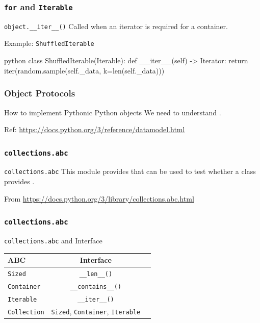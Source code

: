 \documentclass[aspectratio=169,dvipdfmx,12pt,notheorems]{beamer}
\theoremstyle{definition}
\begin{document}
\begin{frame}[fragile]\frametitle{\texttt{for} and \texttt{Iterable}}

\begin{block}{\texttt{object.\_\_iter\_\_()}}
Called when an iterator is required for a container. 
\end{block}

\begin{exampleblock}{Example: \texttt{ShuffledIterable}}
\begin{pygments}{python}
class ShuffledIterable(Iterable):
    def __iter__(self) -> Iterator:
        return iter(random.sample(self._data, k=len(self._data)))
\end{pygments}
\end{exampleblock}

\end{frame}

\begin{frame}\frametitle{Object Protocols}

\begin{block}{How to implement Pythonic Python objects}
We need to understand .
\end{block}
Ref: \url{https://docs.python.org/3/reference/datamodel.html}

\end{frame}

\begin{frame}\frametitle{\texttt{collections.abc}}

\begin{block}{\texttt{collections.abc}}
This module provides  that can be used to test whether a class provides .
\end{block}
From \url{https://docs.python.org/3/library/collections.abc.html}

\end{frame}

\begin{frame}\frametitle{\texttt{collections.abc}}

\begin{exampleblock}{\texttt{collections.abc} and Interface}
\begin{table}[h]
\centering
\begin{tabular}{lcr}
\hline
ABC  & Interface \\
\hline
\texttt{Sized}  & \texttt{\_\_len\_\_()} \\
\texttt{Container}  & \texttt{\_\_contains\_\_()} \\
\texttt{Iterable}  &  \texttt{\_\_iter\_\_()} \\
\texttt{Collection}  & \texttt{Sized}, \texttt{Container}, \texttt{Iterable}  \\
\hline
\end{tabular}
\end{table}
\end{exampleblock}

\end{frame}
\end{document}
